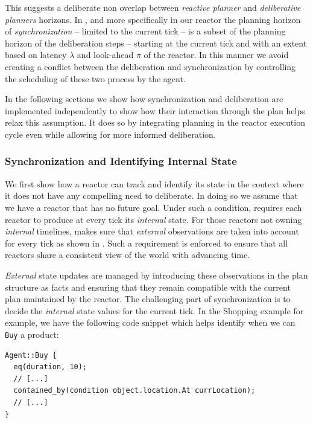 This suggests a deliberate non overlap between {\em reactive planner}
and {\em deliberative planners} horizons. In \rx, and more
specifically in our \eu reactor the planning horizon of {\em
  synchronization} -- limited to the current tick -- is a subset of
the planning horizon of the deliberation steps -- starting at the
current tick and with an extent based on latency $\lambda$ and
look-ahead $\pi$ of the reactor. In this manner we avoid creating a
conflict between the deliberation and synchronization by controlling
the scheduling of these two process by the \rx agent.

In the following sections we show how synchronization and deliberation
are implemented independently to show how their interaction through
the plan helps relax this assumption. It does so by integrating
planning in the reactor execution cycle even while allowing for more
informed deliberation.

\subsubsection{Synchronization and Identifying Internal State}
\label{sec:arch:synch}

We first show how a reactor can track and identify its state in the
context where it does not have any compelling need to deliberate. In
doing so we assume that we have a reactor that has no future
goal. Under such a condition, \rx requires each reactor to produce at
every tick its {\em internal} state. For those reactors not owning
{\em internal} timelines, \rx makes sure that {\em external}
observations are taken into account for every tick as shown in
\cite{py10}. Such a requirement is enforced to ensure that all
reactors share a consistent view of the world with advancing time.

{\em External} state updates are managed by introducing these
observations in the plan structure as facts and ensuring that they
remain compatible with the current plan maintained by the reactor. The
challenging part of synchronization is to decide the {\em internal}
state values for the current tick. In the Shopping example for example,
we have the following code snippet which helps identify when we can
\texttt{Buy} a product:

\begin{verbatim}
Agent::Buy {
  eq(duration, 10);
  // [...]
  contained_by(condition object.location.At currLocation);
  // [...]
}
\end{verbatim}

